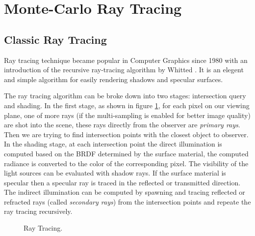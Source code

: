 
\section{Monte-Carlo Ray Tracing} 
\label{sec:mc_rt}

\subsection{Classic Ray Tracing}
\label{subsec:classic_rt} 

Ray tracing technique became popular in Computer Graphics since 1980 with an introduction of the recursive ray-tracing algorithm by Whitted \cite{Whitted1980}. It is an elegent and simple algorithm for easily rendering shadows and specular surfaces. 

The ray tracing algorithm can be broke down into two stages: intersection query and shading. In the first stage, as shown in figure \ref{fig:ray_tracing}, for each pixel on our viewing plane, one of more rays (if the multi-sampling is enabled for better image quality) are shot into the scene, these rays directly from the observer are \emph{primary rays}. Then we are trying to find intersection points with the closest object to observer. In the shading stage, at each intersection point the direct illumination is computed based on the BRDF determined by the surface material, the computed radiance is converted to the color of the corresponding pixel. The visibility of the light sources can be evaluated with shadow rays. If the surface material is specular then a specular ray is traced in the reflected or transmitted direction. The indirect illumination can be computed by spawning and tracing reflected or refracted rays (called \emph{secondary rays}) from the intersection points and repeate the ray tracing recursively. 

\begin{figure}[htp] 
    \centering 
    \renewcommand{\thefigure}{\thechapter.\arabic{figure}}
    \caption[]{Ray Tracing.}
    \label{fig:ray_tracing} 
\end{figure} 

